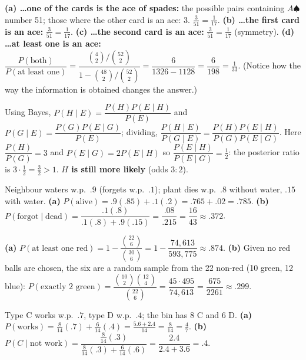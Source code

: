 \documentclass[11pt]{article}
\begin{document}
\begin{exbox}
\textbf{(a) \dots one of the cards is the ace of spades:} the possible pairs containing $A\spadesuit$ number 51; those where the other card is an ace: 3. $\tfrac3{51}=\boxed{\tfrac1{17}}$. \textbf{(b) \dots the first card is an ace:} $\tfrac3{51}=\boxed{\tfrac1{17}}$. \textbf{(c) \dots the second card is an ace:} $\tfrac3{51}=\boxed{\tfrac1{17}}$ (symmetry). \textbf{(d) \dots at least one is an ace:} $\dfrac{P(\text{both})}{P(\text{at least one})}=\dfrac{\binom42/\binom{52}2}{1-\binom{48}2/\binom{52}2}=\dfrac6{1326-1128}=\dfrac6{198}=\boxed{\tfrac1{33}}$. (Notice how the way the information is obtained changes the answer.)
\end{exbox}

\begin{exbox}
Using Bayes, $P(H\mid E)=\dfrac{P(H)P(E\mid H)}{P(E)}$ and $P(G\mid E)=\dfrac{P(G)P(E\mid G)}{P(E)}$; dividing, $\dfrac{P(H\mid E)}{P(G\mid E)}=\dfrac{P(H)P(E\mid H)}{P(G)P(E\mid G)}$. Here $\dfrac{P(H)}{P(G)}=3$ and $P(E\mid G)=2P(E\mid H)$ so $\dfrac{P(E\mid H)}{P(E\mid G)}=\tfrac12$: the posterior ratio is $3\cdot\tfrac12=\tfrac32>1$. \textbf{$H$ is still more likely} (odds $3:2$).
\end{exbox}

\begin{exbox}
Neighbour waters w.p.\ $.9$ (forgets w.p.\ $.1$); plant dies w.p.\ $.8$ without water, $.15$ with water. \textbf{(a)} $P(\text{alive})=.9(.85)+.1(.2)=.765+.02=\boxed{.785}$. \textbf{(b)} $P(\text{forgot}\mid\text{dead})=\dfrac{.1(.8)}{.1(.8)+.9(.15)}=\dfrac{.08}{.215}=\dfrac{16}{43}\approx\boxed{.372}$.
\end{exbox}

\begin{exbox}
\textbf{(a)} $P(\text{at least one red})=1-\dfrac{\binom{22}6}{\binom{30}6}=1-\dfrac{74{,}613}{593{,}775}\approx\boxed{.874}$. \textbf{(b)} Given no red balls are chosen, the six are a random sample from the 22 non-red (10 green, 12 blue): $P(\text{exactly 2 green})=\dfrac{\binom{10}2\binom{12}4}{\binom{22}6}=\dfrac{45\cdot495}{74{,}613}=\dfrac{675}{2261}\approx\boxed{.299}$.
\end{exbox}

\begin{exbox}[3.11 Batteries]
Type C works w.p.\ $.7$, type D w.p.\ $.4$; the bin has 8 C and 6 D. \textbf{(a)} $P(\text{works})=\tfrac8{14}(.7)+\tfrac6{14}(.4)=\tfrac{5.6+2.4}{14}=\tfrac8{14}=\boxed{\tfrac47}$. \textbf{(b)} $P(C\mid\text{not work})=\dfrac{\frac8{14}(.3)}{\frac8{14}(.3)+\frac6{14}(.6)}=\dfrac{2.4}{2.4+3.6}=\boxed{.4}$.
\end{exbox}
\end{document}
